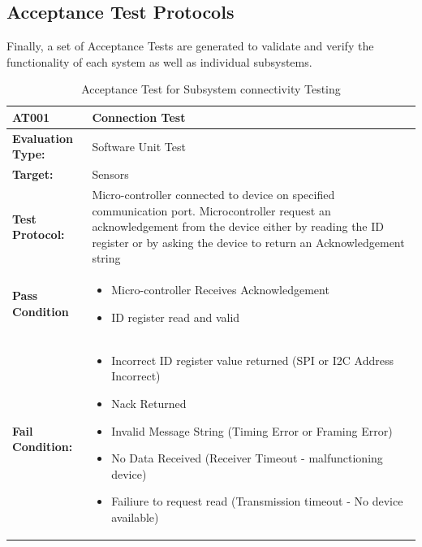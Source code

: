 \subsection{Acceptance Test Protocols}
Finally, a set of Acceptance Tests are generated to validate and verify the functionality of each system as well as individual subsystems.

\begin{table}[H]
    \centering
    \caption{Acceptance Test for Subsystem connectivity Testing}
    \begin{tabular}{|m{}|m{}|}
    \hline
  
   \textbf{AT001 }& \textbf{Connection Test} \\
     \hline
    \textbf{Evaluation Type:} & Software Unit Test\\
     \hline
    \textbf{Target: } & Sensors \\
    \hline
    \textbf{Test Protocol:} & Micro-controller connected to device on specified communication port. Microcontroller request an acknowledgement from the device either by reading the ID register or by asking the device to return an Acknowledgement string\\
    \hline
    \textbf{Pass Condition} & \vspace{5pt} \begin{itemize}
        \item Micro-controller Receives Acknowledgement
        \item ID register read and valid 
    \end{itemize} \\
    \hline
    \textbf{Fail Condition:} & \vspace{5pt} \begin{itemize}
        \item Incorrect ID register value returned (SPI or I2C Address Incorrect)
        \item Nack Returned 
        \item Invalid Message String (Timing Error or Framing Error)
        \item No Data Received (Receiver Timeout - malfunctioning device)
        \item Failiure to request read (Transmission timeout - No device available)
        \end{itemize}\\
        \hline
    \end{tabular}

    \label{tab:AT001}
\end{table}


